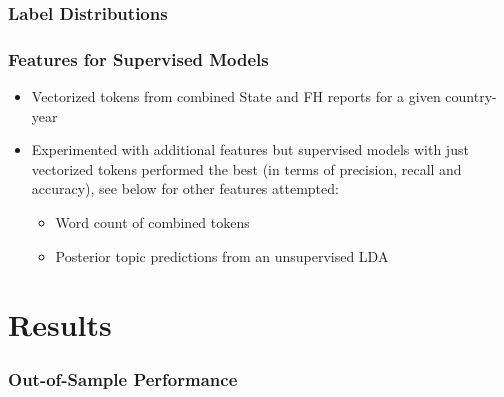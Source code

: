 \documentclass{beamer}
\begin{document}
\begin{frame}
\frametitle{Label Distributions}

\begin{figure}[ht]
	\centering
	\resizebox{1\textwidth}{!}{}	
\end{figure}

\end{frame}

\begin{frame}
\frametitle{Features for Supervised Models}

\begin{itemize}
	\item Vectorized tokens from combined State and FH reports for a given country-year
	\item Experimented with additional features but supervised models with just vectorized tokens performed the best (in terms of precision, recall and accuracy), see below for other features attempted:
	\begin{itemize}
		\item Word count of combined tokens
		\item Posterior topic predictions from an unsupervised LDA
	\end{itemize}
\end{itemize}

\end{frame}

\section{Results}

\begin{frame}
\frametitle{Out-of-Sample Performance}

\begin{figure}[ht]
	\centering
	\resizebox{1\textwidth}{!}{}	
\end{figure}

\end{frame}
\end{document}
